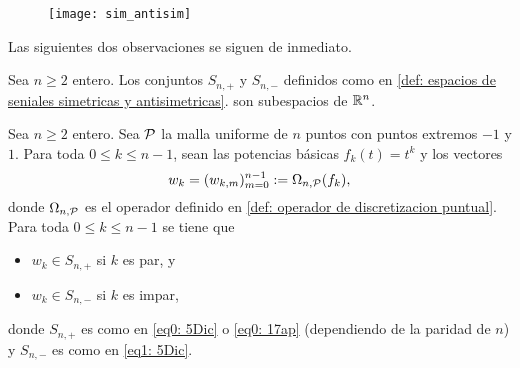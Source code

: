 \begin{figure}[H]
	\centering
	\texttt{[image: sim\_antisim]} 
\end{figure}	

\begin{comment}
{\Huge{$n$ par}}\\

{\Huge{$n$ impar}}\\

{\Huge{$x= (x_{0}, x_{1}, x_{2}, x_{3}, x_{4}, x_{5}) \in S_{6,+}$}}\\

{\Huge{$x= (x_{0}, x_{1}, x_{2}, x_{3}, x_{4}, x_{5}) \in S_{6,-}$}}\\

{\Huge{$x= (x_{0}, x_{1}, x_{2}, x_{3}, x_{4}) \in S_{5,+}$}}\\

{\Huge{$x= (x_{0}, x_{1}, x_{2}, x_{3}, x_{4}) \in S_{5,-}$}}\\
\end{comment}


Las siguientes dos observaciones se siguen de inmediato.
\begin{obs}
\label{obs: espacios de senales sim y antisim}
Sea $n \geq 2$ entero.  
Los conjuntos $S_{n,+}$ y $S_{n,-}$ definidos como en  
\ref{def: espacios de seniales simetricas y antisimetricas}. 
son subespacios de $\mathbb{R}^{n}$.
\end{obs}

\begin{obs}
\label{obs: pertenencia}
Sea $n \geq 2$ entero.  
Sea $\mathcal{P}$ la malla
uniforme de $n$ puntos con puntos extremos $-1$ y $1$.
Para toda $0 \leq k \leq n-1$, sean
las potencias básicas $f_{k}(t)=t^{k}$ y los vectores
\begin{equation}
\label{eq4: 10Dic}
w_{k}=(w_{k,m})_{m=0}^{n-1} := \Omega_{n, \mathcal{P}}(f_{k}),
\end{equation}
donde $\Omega_{n, \mathcal{P}}$ es el operador definido en 
\ref{def: operador de discretizacion puntual}.
Para toda $0 \leq k \leq n-1$ se tiene que
\begin{itemize}
\item $w_{k} \in S_{n,+}$ si $k$ es par, y
\item $w_{k} \in S_{n,-}$ si $k$ es impar,
\end{itemize}
donde $S_{n,+}$ es como en
\eqref{eq0: 5Dic} o \eqref{eq0: 17ap}
(dependiendo de la paridad de $n$) y 
$S_{n,-}$ es como en 
\eqref{eq1: 5Dic}.
\end{obs}

